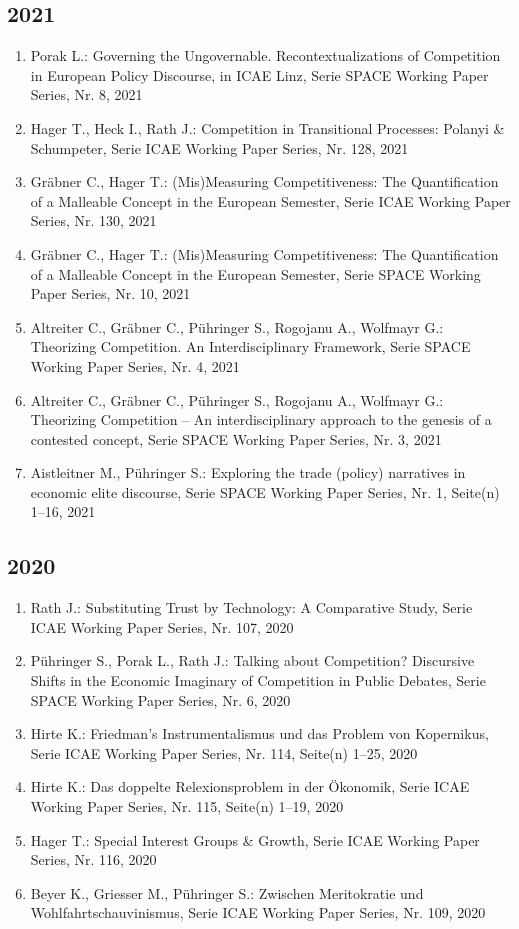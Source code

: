 \subsection*{2021}
\begin{enumerate}
    	 \item Porak L.: Governing the Ungovernable. Recontextualizations of Competition in European Policy Discourse, in ICAE Linz, Serie SPACE Working Paper Series, Nr. 8, 2021
	 \item Hager T., Heck I., Rath J.: Competition in Transitional Processes: Polanyi \& Schumpeter, Serie ICAE Working Paper Series, Nr. 128, 2021
	 \item Gräbner C., Hager T.: (Mis)Measuring Competitiveness: The Quantification of a Malleable Concept in the European Semester, Serie ICAE Working Paper Series, Nr. 130, 2021
	 \item Gräbner C., Hager T.: (Mis)Measuring Competitiveness: The Quantification of a Malleable Concept in the European Semester, Serie SPACE Working Paper Series, Nr. 10, 2021
	 \item Altreiter C., Gräbner C., Pühringer S., Rogojanu A., Wolfmayr G.: Theorizing Competition. An Interdisciplinary Framework, Serie SPACE Working Paper Series, Nr. 4, 2021
	 \item Altreiter C., Gräbner C., Pühringer S., Rogojanu A., Wolfmayr G.: Theorizing Competition -- An interdisciplinary approach to the genesis of a contested concept, Serie SPACE Working Paper Series, Nr. 3, 2021
	 \item Aistleitner M., Pühringer S.: Exploring the trade (policy) narratives in economic elite discourse, Serie SPACE Working Paper Series, Nr. 1, Seite(n) 1--16, 2021
\end{enumerate}
\subsection*{2020}
\begin{enumerate}
    	 \item Rath J.: Substituting Trust by Technology: A Comparative Study, Serie ICAE Working Paper Series, Nr. 107, 2020
	 \item Pühringer S., Porak L., Rath J.: Talking about Competition? Discursive Shifts in the Economic Imaginary of Competition in Public Debates, Serie SPACE Working Paper Series, Nr. 6, 2020
	 \item Hirte K.: Friedman’s Instrumentalismus und das Problem von Kopernikus, Serie ICAE Working Paper Series, Nr. 114, Seite(n) 1--25, 2020
	 \item Hirte K.: Das doppelte Relexionsproblem in der Ökonomik, Serie ICAE Working Paper Series, Nr. 115, Seite(n) 1--19, 2020
	 \item Hager T.: Special Interest Groups \& Growth, Serie ICAE Working Paper Series, Nr. 116, 2020
	 \item Beyer K., Griesser M., Pühringer S.: Zwischen Meritokratie und Wohlfahrtschauvinismus, Serie ICAE Working Paper Series, Nr. 109, 2020
\end{enumerate}
